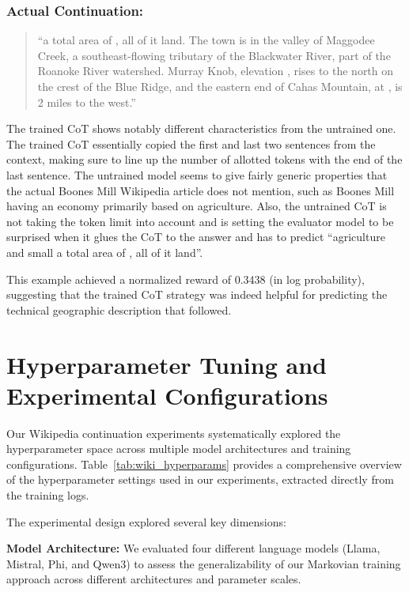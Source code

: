 \documentclass{article}
\begin{document}
\subsubsection{Actual Continuation:}
\begin{quote}
``a total area of , all of it land. The town is in the valley of Maggodee Creek, a southeast-flowing tributary of the Blackwater River, part of the Roanoke River watershed. Murray Knob, elevation , rises  to the north on the crest of the Blue Ridge, and the eastern end of Cahas Mountain, at , is 2 miles to the west.''
\end{quote}

The trained CoT shows notably different characteristics from the untrained one. The trained CoT essentially copied the first and last two sentences from the context, making sure to line up the number of allotted tokens with the end of the last sentence. The untrained model seems to give fairly generic properties that the actual Boones Mill Wikipedia article does not mention, such as Boones Mill having an economy primarily based on agriculture. Also, the untrained CoT is not taking the token limit into account and is setting the evaluator model to be surprised when it glues the CoT to the answer and has to predict ``agriculture and small a total area of , all of it land''.

This example achieved a normalized reward of 0.3438 (in log probability), suggesting that the trained CoT strategy was indeed helpful for predicting the technical geographic description that followed.

\section{Hyperparameter Tuning and Experimental Configurations}
\label{sec:hyperparameters}

Our Wikipedia continuation experiments systematically explored the hyperparameter space across multiple model architectures and training configurations. Table~\ref{tab:wiki_hyperparams} provides a comprehensive overview of the hyperparameter settings used in our experiments, extracted directly from the training logs.

The experimental design explored several key dimensions:

\textbf{Model Architecture:} We evaluated four different language models (Llama, Mistral, Phi, and Qwen3) to assess the generalizability of our Markovian training approach across different architectures and parameter scales.
\end{document}
